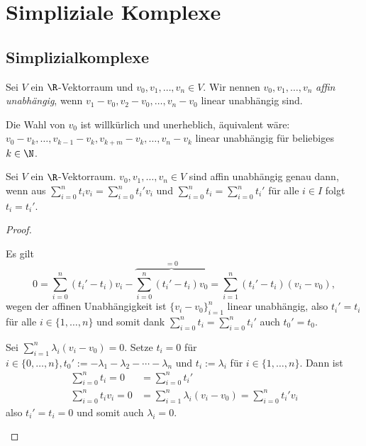 
\chapter{Simpliziale Komplexe}

\section{Simplizialkomplexe}

\begin{df}
	Sei $V$ ein $\R$-Vektorraum und $v_0, v_1, \dotsc, v_n \in V$.
	Wir nennen $v_0, v_1, \dotsc, v_n$ \emph{affin unabhängig}, wenn $v_1 - v_0, v_2 - v_0, \dotsc, v_n - v_0$ linear unabhängig sind.
	\begin{note}
		Die Wahl von $v_0$ ist willkürlich und unerheblich, äquivalent wäre: $v_0 - v_k, \dotsc, v_{k-1} - v_k, v_{k+m} - v_k, \dotsc, v_n - v_k$ linear unabhängig für beliebiges $k \in \N$.
	\end{note}
\end{df}

\begin{prop} \label{prop:affine_independent}
	Sei $V$ ein $\R$-Vektorraum.
	$v_0, v_1, \dotsc, v_n \in V$ sind affin unabhängig genau dann, wenn aus $\sum_{i=0}^n t_i v_i = \sum_{i=0}^n t_i' v_i$ und $\sum_{i=0}^n t_i = \sum_{i=0}^n t_i'$ für alle $i \in I$ folgt $t_i = t_i'$.
	\begin{proof}
		\begin{segnb}[„$\implies$“]
			Es gilt
			\[
				0
				= \sum_{i=0}^n (t_i' - t_i) v_i - \overbrace{\sum_{i=0}^n (t_i' - t_i) v_0}^{= 0}
				= \sum_{i=1}^n (t_i' - t_i) (v_i - v_0),
			\]
			wegen der affinen Unabhängigkeit ist $\{v_i - v_0\}_{i=1}^n$ linear unabhängig, also $t_i' = t_i$ für alle $i \in \{1, \dotsc, n\}$ und somit dank $\sum_{i=0}^n t_i = \sum_{i=0}^n t_i'$ auch $t_0' = t_0$.
		\end{segnb}
		\begin{segnb}[„$\implies$“]
			Sei $\sum_{i=1}^n \lambda_i (v_i - v_0) = 0$.
			Setze $t_i = 0$ für $i \in \{0, \dotsc, n\}, t_0' := -\lambda_1 - \lambda_2 - \dotsb - \lambda_n$ und $t_i := \lambda_i$ für $i \in \{1, \dotsc, n\}$.
			Dann ist
			\begin{align*}
				\sum_{i=0}^n t_i = 0 &= \sum_{i=0}^n t_i' \\
				\sum_{i=0}^n t_i v_i = 0 &= \sum_{i=1}^n \lambda_i (v_i - v_0) = \sum_{i=0}^n t_i' v_i
			\end{align*}
			also $t_i' = t_i = 0$ und somit auch $\lambda_i = 0$.
		\end{segnb}
	\end{proof}
\end{prop}

